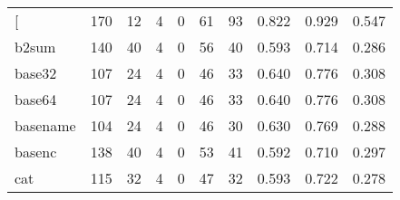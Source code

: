 \begin{longtable}{lp{1.3cm}p{1.3cm}p{1.3cm}p{1.3cm}p{1.3cm}p{1.3cm}p{1.3cm}p{1.3cm}p{1.3cm}}
\bottomrule
\endlastfoot
{[}         &                    170 &                                 12 &                                 4 &                                0 &                                61 &                              93 &                                0.822 &                                  0.929 &                                0.547 \\
b2sum     &                    140 &                                 40 &                                 4 &                                0 &                                56 &                              40 &                                0.593 &                                  0.714 &                                0.286 \\
base32    &                    107 &                                 24 &                                 4 &                                0 &                                46 &                              33 &                                0.640 &                                  0.776 &                                0.308 \\
base64    &                    107 &                                 24 &                                 4 &                                0 &                                46 &                              33 &                                0.640 &                                  0.776 &                                0.308 \\
basename  &                    104 &                                 24 &                                 4 &                                0 &                                46 &                              30 &                                0.630 &                                  0.769 &                                0.288 \\
basenc    &                    138 &                                 40 &                                 4 &                                0 &                                53 &                              41 &                                0.592 &                                  0.710 &                                0.297 \\
cat       &                    115 &                                 32 &                                 4 &                                0 &                                47 &                              32 &                                0.593 &                                  0.722 &                                0.278 \\

\end{longtable}
